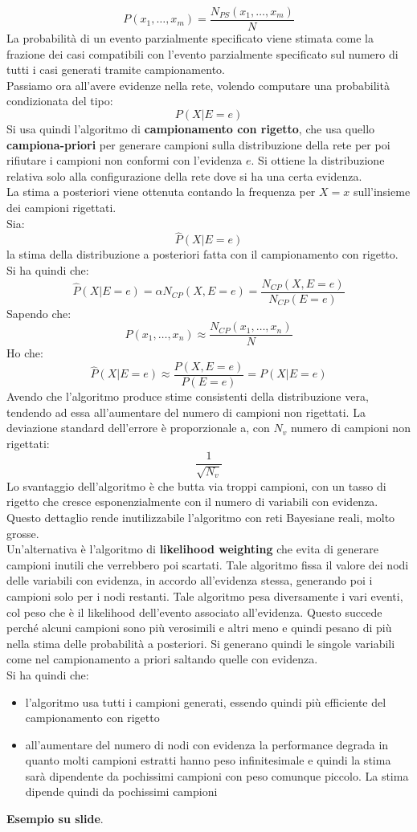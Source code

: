 \documentclass[a4paper,12pt, oneside]{book}
\begin{document}
\[P(x_1,\ldots,x_m)=\frac{N_{PS}(x_1,\ldots,x_m)}{N}\]
La probabilità di un evento parzialmente specificato viene stimata come la
frazione dei casi compatibili con l’evento parzialmente specificato sul numero
di tutti i casi generati tramite campionamento. \\
Passiamo ora all'avere evidenze nella rete, volendo computare una probabilità
condizionata del tipo: 
\[P(X|E=e)\]
Si usa quindi l'algoritmo di \textbf{campionamento con rigetto}, che usa quello
\textbf{campiona-priori} per generare campioni sulla distribuzione della rete
per poi rifiutare i campioni non conformi con l'evidenza $e$. Si ottiene la
distribuzione relativa solo alla configurazione della rete dove si ha una certa
evidenza.\\ 
La stima a posteriori viene ottenuta contando la frequenza per $X=x$
sull'insieme dei campioni rigettati.\\
Sia:
\[\hat{P}(X|E=e)\]
la stima della distribuzione a posteriori fatta con il campionamento con
rigetto.\\ 
Si ha quindi che:
\[\hat{P}(X|E=e)=\alpha N_{CP}(X,E=e)=\frac{N_{CP}(X,E=e)}{N_{CP}(E=e)}\]
Sapendo che:
\[P(x_1,\ldots,x_n)\approx\frac{N_{CP}(x_1,\ldots,x_n)}{N}\]
Ho che:
\[\hat{P}(X|E=e)\approx\frac{P(X,E=e)}{P(E=e)}=P(X|E=e)\]
Avendo che l'algoritmo produce stime consistenti della distribuzione vera,
tendendo ad essa all'aumentare del numero di campioni non rigettati. La
deviazione standard dell'errore è proporzionale a, con $N_v$ numero di campioni
non rigettati:
\[\frac{1}{\sqrt{N_v}}\]
Lo svantaggio dell'algoritmo è che butta via troppi campioni, con un tasso di
rigetto che cresce esponenzialmente con il numero di variabili con
evidenza. Questo dettaglio rende inutilizzabile l'algoritmo con reti Bayesiane
reali, molto grosse.\\
Un'alternativa è l'algoritmo di \textbf{likelihood weighting} che evita di
generare campioni inutili che verrebbero poi scartati. Tale algoritmo fissa il
valore dei nodi delle variabili con evidenza, in accordo all'evidenza stessa,
generando poi i campioni solo per i nodi restanti. Tale algoritmo pesa
diversamente i vari eventi, col peso che è il likelihood dell'evento associato
all'evidenza. Questo succede perché alcuni campioni sono più verosimili e altri
meno e quindi pesano di più nella stima delle probabilità a posteriori. Si
generano quindi le singole variabili come nel 
campionamento a priori saltando quelle con evidenza.\\ 
Si ha quindi che:
\begin{itemize}
  \item l'algoritmo usa tutti i campioni generati, essendo quindi più efficiente
  del campionamento con rigetto
  \item all'aumentare del numero di nodi con evidenza la performance degrada in
  quanto molti campioni estratti hanno peso infinitesimale e quindi la stima
  sarà dipendente da pochissimi campioni con peso comunque piccolo. La stima
  dipende quindi da pochissimi campioni
\end{itemize}
\textbf{Esempio su slide}.
\end{document}
